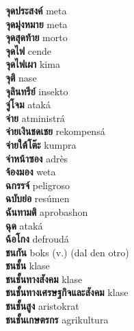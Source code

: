 \textbf{ จุดประสงค์  } meta \\
\textbf{ จุดมุ่งหมาย  } meta \\
\textbf{ จุดสุดท้าย  } morto \\
\textbf{ จุดไฟ  } cende \\
\textbf{ จุดไฟเผา  } kima \\
\textbf{ จุติ  } nase \\
\textbf{ จุลินทรีย์  } insekto \\
\textbf{ จู่โจม  } ataká \\
\textbf{ จ่าย  } atministrá \\
\textbf{ จ่ายเงินชดเชย  } rekompensá \\
\textbf{ จ่ายใต้โต๊ะ  } kumpra \\
\textbf{ จ่าหน้าซอง  } adrès \\
\textbf{ จ้องมอง  } weta \\
\textbf{ ฉกรรจ์  } peligroso \\
\textbf{ ฉบับย่อ  } resúmen \\
\textbf{ ฉันทามติ  } aprobashon \\
\textbf{ ฉุด  } ataká \\
\textbf{ ฉ้อโกง  } defroudá \\
\textbf{ ชนกัน  } boks (v.) (dal den otro) \\
\textbf{ ชนชั้น  } klase \\
\textbf{ ชนชั้นทางสังคม  } klase \\
\textbf{ ชนชั้นทางเศรษฐกิจและสังคม  } klase \\
\textbf{ ชนชั้นสูง  } aristokrat \\
\textbf{ ชนชั้นเกษตรกร  } agrikultura \\
